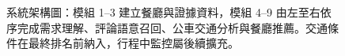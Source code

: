 
\begin{figure}[H]
\singlespacing
\centering
\resizebox{\textwidth}{!}{}
\caption[系統架構圖]{系統架構圖：模組 1--3 建立餐廳與證據資料，模組 4--9 由左至右依序完成需求理解、評論語意召回、公車交通分析與餐廳推薦。交通條件在最終排名前納入，行程中監控屬後續擴充。}
\label{fig:architecture}
\end{figure}
